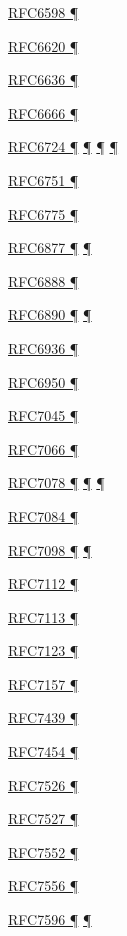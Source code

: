 \documentclass[
]{article}
\begin{document}
\hyperref[address-planning]{RFC6598 ¶}

\hyperref[layer-2-considerations]{RFC6620 ¶}

\hyperref[address-resolution]{RFC6636 ¶}

\hyperref[filtering]{RFC6666 ¶}

\hyperref[how-an-application-programmer-sees-ipv6]{RFC6724 ¶}
\hyperref[dns]{¶} \hyperref[source-and-destination-address-selection]{¶}
\hyperref[multi-prefix-operation]{¶}

\hyperref[obsolete-techniques]{RFC6751 ¶}

\hyperref[address-resolution]{RFC6775 ¶}

\hyperref[dual-stack-scenarios]{RFC6877 ¶}
\hyperref[translation-and-ipv4-as-a-service]{¶}

\hyperref[dual-stack-scenarios]{RFC6888 ¶}

\hyperref[addresses]{RFC6890 ¶} \hyperref[filtering]{¶}

\hyperref[transport-protocols]{RFC6936 ¶}

\hyperref[multi-prefix-operation]{RFC6950 ¶}

\hyperref[filtering]{RFC7045 ¶}

\hyperref[managed-configuration]{RFC7066 ¶}

\hyperref[dns]{RFC7078 ¶}
\hyperref[source-and-destination-address-selection]{¶}
\hyperref[multi-prefix-operation]{¶}

\hyperref[routing]{RFC7084 ¶}

\hyperref[traffic-class-and-flow-label]{RFC7098 ¶}
\hyperref[topology-obfuscation]{¶}

\hyperref[layer-2-considerations]{RFC7112 ¶}

\hyperref[layer-2-considerations]{RFC7113 ¶}

\hyperref[filtering]{RFC7123 ¶}

\hyperref[multihoming]{RFC7157 ¶}

\hyperref[tunnels]{RFC7439 ¶}

\hyperref[filtering]{RFC7454 ¶}

\hyperref[obsolete-techniques]{RFC7526 ¶}

\hyperref[auto-configuration]{RFC7527 ¶}

\hyperref[tunnels]{RFC7552 ¶}

\hyperref[multihoming]{RFC7556 ¶}

\hyperref[dual-stack-scenarios]{RFC7596 ¶}
\hyperref[translation-and-ipv4-as-a-service]{¶}
\end{document}
